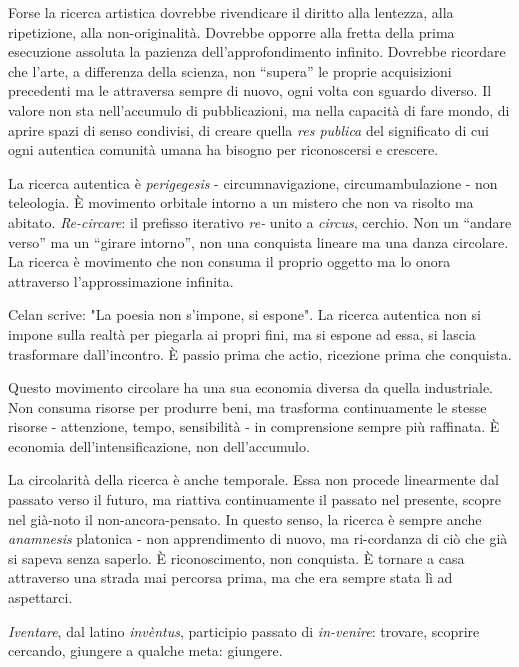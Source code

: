 Forse la ricerca artistica dovrebbe rivendicare il diritto alla lentezza, alla
ripetizione, alla non-originalità. Dovrebbe opporre alla fretta della prima
esecuzione assoluta la pazienza dell'approfondimento infinito. Dovrebbe ricordare
che l'arte, a differenza della scienza, non “supera” le proprie acquisizioni
precedenti ma le attraversa sempre di nuovo, ogni volta con sguardo diverso.
Il valore non sta nell'accumulo di pubblicazioni, ma nella capacità di fare mondo,
di aprire spazi di senso condivisi, di creare quella \emph{res publica} del
significato di cui ogni autentica comunità umana ha bisogno per riconoscersi e
crescere.

La ricerca autentica è \emph{perigegesis} - circumnavigazione, circumambulazione
- non teleologia. È movimento orbitale intorno a un mistero che non va risolto
ma abitato. \emph{Re-circare}: il prefisso iterativo \emph{re-} unito a
\emph{circus}, cerchio. Non un “andare verso” ma un “girare intorno”, non una
conquista lineare ma una danza circolare. La ricerca è movimento che non consuma
il proprio oggetto ma lo onora attraverso l'approssimazione infinita.

Celan scrive: "La poesia non s'impone, si espone". La ricerca autentica non si impone sulla realtà per piegarla ai propri fini, ma si espone ad essa, si lascia trasformare dall'incontro. È passio prima che actio, ricezione prima che conquista.

Questo movimento circolare ha una sua economia diversa da quella industriale. Non consuma risorse per produrre beni, ma trasforma continuamente le stesse risorse - attenzione, tempo, sensibilità - in comprensione sempre più raffinata. È economia dell'intensificazione, non dell'accumulo.

La circolarità della ricerca è anche temporale. Essa non procede linearmente
dal passato verso il futuro, ma riattiva continuamente il passato nel presente,
scopre nel già-noto il non-ancora-pensato. In questo senso, la ricerca è sempre
anche \emph{anamnesis} platonica - non apprendimento di nuovo, ma ri-cordanza di
ciò che già si sapeva senza saperlo. È riconoscimento, non conquista. È tornare
a casa attraverso una strada mai percorsa prima, ma che era sempre stata lì ad
aspettarci.

\emph{Iventare}, dal latino \emph{invèntus}, participio passato di \emph{in-venire}:
trovare, scoprire cercando, giungere a qualche meta: giungere.
